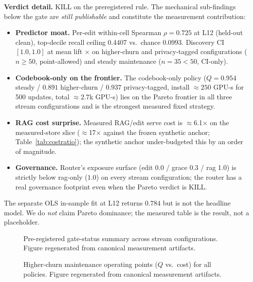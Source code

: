\documentclass[preprint,12pt]{elsarticle}
\begin{document}
{\footnotesize
\noindent\textbf{Verdict detail.} KILL on the preregistered rule. The mechanical
sub-findings below the gate are \emph{still publishable} and constitute the
measurement contribution:
\begin{itemize}
\item \textbf{Predictor moat.} Per-edit within-cell Spearman $\rho = 0.725$ at L12
(held-out clean), top-decile recall ceiling 0.4407 vs.\ chance 0.0993. Discovery CI
$[1.0, 1.0]$ at mean lift \discLift$\times$ on higher-churn and privacy-tagged configurations ($n \ge 50$, point-allowed)
and steady maintenance ($n = 35 < 50$, CI-only).
\item \textbf{Codebook-only on the frontier.} The codebook-only policy ($Q = 0.954$ steady /
$0.891$ higher-churn / $0.937$ privacy-tagged,
install $\approx 250$ GPU-s for 500 updates, total $\approx 2.7$k GPU-s) lies on
the Pareto frontier in all three stream configurations and is the strongest measured
fixed strategy.
\item \textbf{RAG cost surprise.} Measured RAG/edit serve cost is $\approx$6.1$\times$
on the measured-store slice ($\approx$17$\times$ against the frozen synthetic anchor;
Table~\ref{tab:costratio}); the synthetic anchor under-budgeted this
by an order of magnitude.
\item \textbf{Governance.} Router's exposure surface (edit 0.0 / grace 0.3 / rag 1.0)
is strictly below rag-only ($1.0$) on every stream configuration; the router has a real
governance footprint even when the Pareto verdict is KILL.
\end{itemize}
The separate OLS in-sample fit at L12 returns $0.784$ but is not the headline
model. We do \emph{not} claim Pareto dominance; the measured table is the result,
not a placeholder.
\par}

\begin{figure}[t]
\centering

\caption{Pre-registered gate-status summary across stream configurations. Figure regenerated from canonical measurement artifacts.}
\label{fig:gatestatus}
\end{figure}

\begin{figure}[t]
\centering

\caption{Higher-churn maintenance operating points ($Q$ vs.\ cost) for all policies. Figure regenerated from canonical measurement artifacts.}
\label{fig:higher-churn}
\end{figure}
\end{document}
